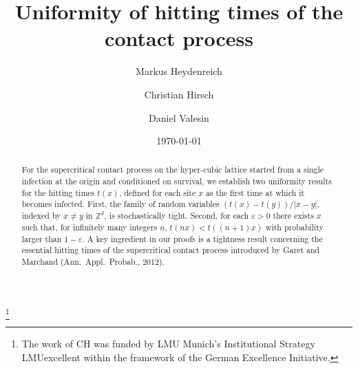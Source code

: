 \documentclass[11pt,a4paper,reqno]{amsart}
\begin{document}
\author{Markus Heydenreich}
\author{Christian Hirsch}
\address[Markus Heydenreich, Christian Hirsch]{Mathematisches Institut, Ludwig-Maximilians-Universit\"at M\"unchen, Theresienstra\ss e 39, 80333 M\"unchen, Germany}
\author{Daniel Valesin}
\address[Daniel Valesin]{Johann Bernoulli Institute, University of Groningen, Nijenborgh 9, 9747AG Groningen, The Netherlands}



\thanks{The work of CH was funded by LMU Munich's Institutional Strategy LMUexcellent within the framework of the German Excellence Initiative.}



\title{Uniformity of hitting times of the contact process}

\date{\today}

\begin{abstract}
For the supercritical contact process on the hyper-cubic lattice started from a single infection at the origin and conditioned on survival, we establish two uniformity results for the hitting times $t(x)$, defined for each site $x$ as the first time at which it becomes infected. First, the family of random variables $(t(x)-t(y))/|x-y|$, indexed by $x \neq y$ in $\mathbb{Z}^d$, is stochastically tight. Second, for each $\varepsilon >0$ there exists $x$ such that, for infinitely many integers $n$, $t(nx) < t((n+1)x)$ with probability larger than $1-\varepsilon$.  A key ingredient in our proofs is a tightness result concerning the essential hitting times of the supercritical contact process introduced by Garet and Marchand (Ann.\ Appl.\ Probab., 2012).\end{abstract}

\maketitle


	
	
	




\end{document}
